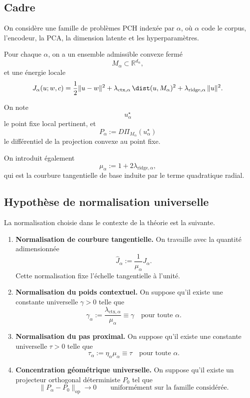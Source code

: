 \subsection{Cadre}

On considère une famille de problèmes PCH indexée par \(\alpha\), où \(\alpha\) code le corpus, l'encodeur, la PCA, la dimension latente et les hyperparamètres.

Pour chaque \(\alpha\), on a un ensemble admissible convexe fermé
\[
M_\alpha \subset \mathbb R^{d_\alpha},
\]
et une énergie locale
\[
J_\alpha(u;w,c)
=
\frac12\|u-w\|^2
+
\lambda_{\mathrm{ctx},\alpha}\,\dist(u,M_\alpha)^2
+
\lambda_{\mathrm{ridge},\alpha}\,\|u\|^2.
\]

On note
\[
u_\alpha^\star
\]
le point fixe local pertinent, et
\[
P_\alpha := D\Pi_{M_\alpha}(u_\alpha^\star)
\]
le différentiel de la projection convexe au point fixe.

On introduit également
\[
\mu_\alpha := 1+2\lambda_{\mathrm{ridge},\alpha},
\]
qui est la courbure tangentielle de base induite par le terme quadratique radial.

\subsection{Hypothèse de normalisation universelle}

La normalisation choisie dans le contexte de la théorie est la suivante.

\begin{enumerate}
    \item \textbf{Normalisation de courbure tangentielle.}
    On travaille avec la quantité adimensionnée
    \[
    \widehat J_\alpha := \frac{1}{\mu_\alpha}J_\alpha.
    \]
    Cette normalisation fixe l'échelle tangentielle à l'unité.

    \item \textbf{Normalisation du poids contextuel.}
    On suppose qu'il existe une constante universelle \(\gamma>0\) telle que
    \[
    \gamma_\alpha := \frac{\lambda_{\mathrm{ctx},\alpha}}{\mu_\alpha} \equiv \gamma
    \quad\text{pour toute } \alpha.
    \]

    \item \textbf{Normalisation du pas proximal.}
    On suppose qu'il existe une constante universelle \(\tau>0\) telle que
    \[
    \tau_\alpha := \eta_\alpha \mu_\alpha \equiv \tau
    \quad\text{pour toute } \alpha.
    \]

    \item \textbf{Concentration géométrique universelle.}
    On suppose qu'il existe un projecteur orthogonal déterministe \(P_0\) tel que
    \[
    \|P_\alpha - P_0\|_{\mathrm{op}} \to 0
    \qquad\text{uniformément sur la famille considérée.}
    \]
\end{enumerate}

